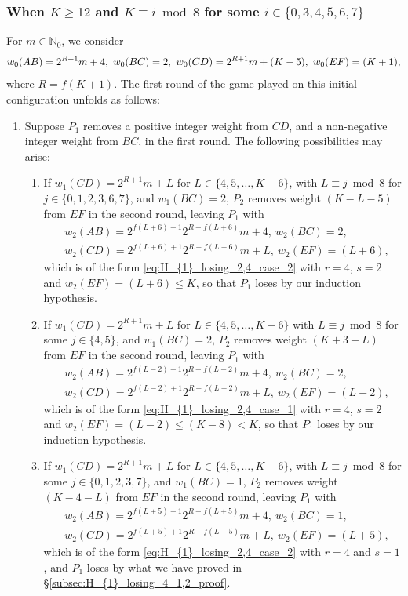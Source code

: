 \documentclass[11pt,reqno]{amsart}
\theoremstyle{definition}
\theoremstyle{definition}
\begin{document}
\subsubsection{When $K \geqslant 12$ and $K \equiv i \bmod 8$ for some $i \in \{0,3,4,5,6,7\}$} For $m \in \mathbb{N}_{0}$, we consider
\begin{equation}
w_{0}(AB)=2^{R+1}m+4,\ w_{0}(BC)=2,\ w_{0}(CD)=2^{R+1}m+(K-5),\ w_{0}(EF)=(K+1),\label{eq:H_{1}_losing_4_3_inductive}
\end{equation}
where $R=f(K+1)$. The first round of the game played on this initial configuration unfolds as follows:
\begin{enumerate}
\item Suppose $P_{1}$ removes a positive integer weight from $CD$, and a non-negative integer weight from $BC$, in the first round. The following possibilities may arise:
\begin{enumerate}
\item If $w_{1}(CD)=2^{R+1}m+L$ for $L \in \{4,5,\ldots,K-6\}$, with $L \equiv j \bmod 8$ for $j \in \{0,1,2,3,6,7\}$, and $w_{1}(BC)=2$, $P_{2}$ removes weight $(K-L-5)$ from $EF$ in the second round, leaving $P_{1}$ with
\begin{align}
{}&w_{2}(AB)=2^{f(L+6)+1}2^{R-f(L+6)}m+4,\ w_{2}(BC)=2,\nonumber\\
{}&w_{2}(CD)=2^{f(L+6)+1}2^{R-f(L+6)}m+L,\ w_{2}(EF)=(L+6),\nonumber
\end{align}
which is of the form \eqref{eq:H_{1}_losing_2,4_case_2} with $r=4$, $s=2$ and $w_{2}(EF)=(L+6)\leqslant K$, so that $P_{1}$ loses by our induction hypothesis.

\item If $w_{1}(CD)=2^{R+1}m+L$ for $L \in \{4,5,\ldots,K-6\}$ with $L \equiv j \bmod 8$ for some $j \in \{4,5\}$, and $w_{1}(BC)=2$, $P_{2}$ removes weight $(K+3-L)$ from $EF$ in the second round, leaving $P_{1}$ with
\begin{align}
{}&w_{2}(AB)=2^{f(L-2)+1}2^{R-f(L-2)}m+4,\ w_{2}(BC)=2,\nonumber\\
{}&w_{2}(CD)=2^{f(L-2)+1}2^{R-f(L-2)}m+L,\ w_{2}(EF)=(L-2),\nonumber
\end{align}
which is of the form \eqref{eq:H_{1}_losing_2,4_case_1} with $r=4$, $s=2$ and $w_{2}(EF)=(L-2)\leqslant (K-8)<K$, so that $P_{1}$ loses by our induction hypothesis.

\item If $w_{1}(CD)=2^{R+1}m+L$ for $L \in \{4,5,\ldots,K-6\}$, with $L \equiv j \bmod 8$ for some $j \in \{0,1,2,3,7\}$, and $w_{1}(BC)=1$, $P_{2}$ removes weight $(K-4-L)$ from $EF$ in the second round, leaving $P_{1}$ with
\begin{align}
{}&w_{2}(AB)=2^{f(L+5)+1}2^{R-f(L+5)}m+4,\ w_{2}(BC)=1,\nonumber\\
{}&w_{2}(CD)=2^{f(L+5)+1}2^{R-f(L+5)}m+L,\ w_{2}(EF)=(L+5),\nonumber
\end{align}
which is of the form \eqref{eq:H_{1}_losing_2,4_case_2} with $r=4$ and $s=1$, and $P_{1}$ loses by what we have proved in \S\ref{subsec:H_{1}_losing_4_1,2_proof}. 


\end{enumerate}
\end{enumerate}
\end{document}
